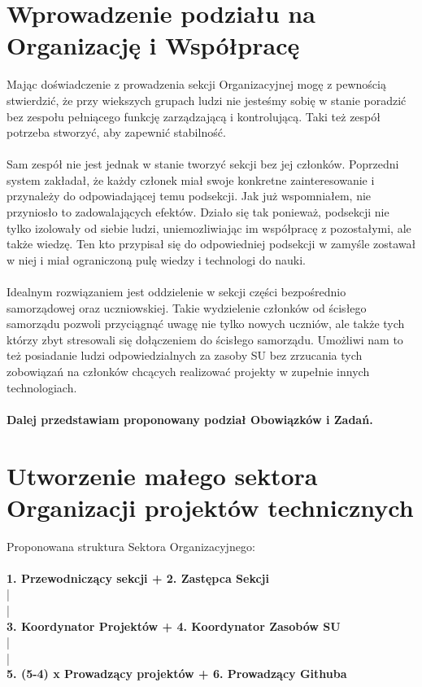 \documentclass[9pt,a4paper]{report}
\begin{document}
\section{Wprowadzenie podziału na Organizację i Współpracę}
Mając doświadczenie z prowadzenia sekcji Organizacyjnej mogę z pewnością stwierdzić, że przy wiekszych grupach ludzi nie jesteśmy sobię w stanie poradzić bez zespołu pełniącego funkcję zarządzającą i kontrolującą. Taki też zespół potrzeba stworzyć, aby zapewnić stabilność.\\\\
Sam zespół nie jest jednak w stanie tworzyć sekcji bez jej członków. Poprzedni system zakładał, że każdy członek miał swoje konkretne zainteresowanie i przynależy do odpowiadającej temu podsekcji. Jak już wspomniałem, nie przyniosło to zadowalających efektów. Działo się tak ponieważ, podsekcji nie tylko izolowały od siebie ludzi, uniemozliwiając im współpracę z pozostałymi, ale także wiedzę. Ten kto przypisał się do odpowiedniej podsekcji w zamyśle zostawał w niej i miał ograniczoną pulę wiedzy i technologi do nauki.\\\\
Idealnym rozwiązaniem jest oddzielenie w sekcji części bezpośrednio samorządowej oraz uczniowskiej. Takie wydzielenie członków od ścisłego samorządu pozwoli przyciągnąć uwagę nie tylko nowych uczniów, ale także tych którzy zbyt stresowali się dołączeniem do ścisłego samorządu. Umożliwi nam to też posiadanie ludzi odpowiedzialnych za zasoby SU bez zrzucania tych zobowiązań na członków chcących realizować projekty w zupełnie innych technologiach.\\\\
\textbf{Dalej przedstawiam proponowany podział Obowiązków i Zadań.}

\section{Utworzenie małego sektora Organizacji projektów technicznych}
Proponowana struktura Sektora Organizacyjnego:\\\\
\textbf{1. Przewodniczący sekcji + 2. Zastępca Sekcji}\\
|\\
|\\
\textbf{3. Koordynator Projektów + 4. Koordynator Zasobów SU}\\
|\\
|\\
\textbf{5. (5-4) x Prowadzący projektów + 6. Prowadzący Githuba}\\
\end{document}
